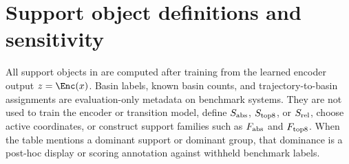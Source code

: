 \section{Support object definitions and sensitivity}
\label{sec:supp_table_a1_support_object_definitions}

All support objects in 
are computed after training from the learned encoder output
\(z=\Enc(x)\). Basin labels, known basin counts, and trajectory-to-basin
assignments are evaluation-only metadata on benchmark systems. They are not
used to train the encoder or transition model, define \(S_{\rm abs}\),
\(S_{\rm top8}\), or \(S_{\rm rel}\), choose active coordinates, or construct
support families such as \(F_{\rm abs}\) and \(F_{\rm top8}\). When the table
mentions a dominant support or dominant group, that dominance is a post-hoc
display or scoring annotation against withheld benchmark labels.

